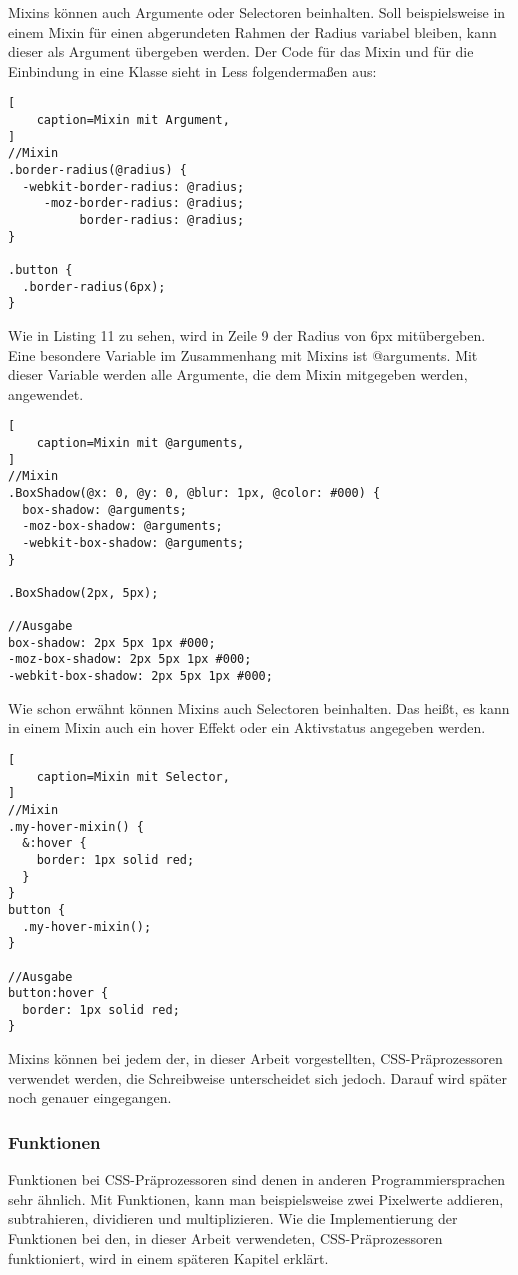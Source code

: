 Mixins können auch Argumente oder Selectoren beinhalten. \newline
Soll beispielsweise in einem Mixin für einen abgerundeten Rahmen der Radius variabel bleiben, kann dieser als Argument übergeben werden. Der Code für das Mixin und für die Einbindung in eine Klasse sieht in Less folgendermaßen aus:
\newpage
\begin{lstlisting}[
	caption=Mixin mit Argument,
]
//Mixin
.border-radius(@radius) {
  -webkit-border-radius: @radius;
     -moz-border-radius: @radius;
          border-radius: @radius;
}

.button {
  .border-radius(6px);
}
\end{lstlisting}
Wie in Listing 11 zu sehen, wird in Zeile 9 der Radius von 6px mitübergeben. \autocite[]{thecorelessteam.}\newline 
Eine besondere Variable im Zusammenhang mit Mixins ist @arguments. Mit dieser Variable werden alle Argumente, die dem Mixin mitgegeben werden, angewendet. \autocite[]{Gerchev.2012}
\begin{lstlisting}[
	caption=Mixin mit @arguments,
]
//Mixin
.BoxShadow(@x: 0, @y: 0, @blur: 1px, @color: #000) {
  box-shadow: @arguments;
  -moz-box-shadow: @arguments;
  -webkit-box-shadow: @arguments;
}

.BoxShadow(2px, 5px);

//Ausgabe
box-shadow: 2px 5px 1px #000;
-moz-box-shadow: 2px 5px 1px #000;
-webkit-box-shadow: 2px 5px 1px #000;
\end{lstlisting}
Wie schon erwähnt können Mixins auch Selectoren beinhalten. Das heißt, es kann in einem Mixin auch ein hover Effekt oder ein Aktivstatus angegeben werden.
\begin{lstlisting}[
	caption=Mixin mit Selector,
]
//Mixin
.my-hover-mixin() {
  &:hover {
    border: 1px solid red;
  }
}
button {
  .my-hover-mixin();
}

//Ausgabe
button:hover {
  border: 1px solid red;
}
\end{lstlisting}
Mixins können bei jedem der, in dieser Arbeit vorgestellten, CSS-Präprozessoren verwendet werden, die Schreibweise unterscheidet sich jedoch. Darauf wird später noch genauer eingegangen.
\subsubsection{Funktionen}
Funktionen bei CSS-Präprozessoren sind denen in anderen Programmiersprachen sehr ähnlich. Mit Funktionen, kann man beispielsweise zwei Pixelwerte addieren, subtrahieren, dividieren und multiplizieren. Wie die Implementierung der Funktionen bei den, in dieser Arbeit verwendeten, CSS-Präprozessoren funktioniert, wird in einem späteren Kapitel erklärt.
